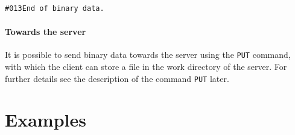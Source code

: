 \documentclass[12pt,titlepage]{book}
\begin{document}
\begin{verbatim}
#013End of binary data.
\end{verbatim}


\subsubsection{Towards the server}
It is possible to send binary data towards the server using the
\verb|PUT| command, with which the client can store a file in the
work directory of the server. For further details see the description
of the command \verb|PUT| later.



\chapter{Examples}
\label{chap:examples}
\end{document}
